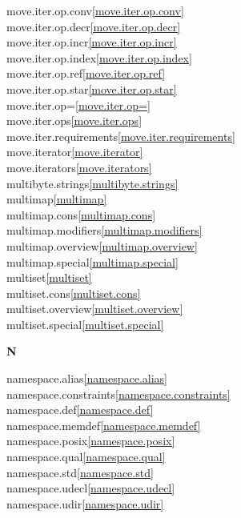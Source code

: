 \begin{multicols}{2}
move.iter.op.conv\quad\ref{move.iter.op.conv}\\
move.iter.op.decr\quad\ref{move.iter.op.decr}\\
move.iter.op.incr\quad\ref{move.iter.op.incr}\\
move.iter.op.index\quad\ref{move.iter.op.index}\\
move.iter.op.ref\quad\ref{move.iter.op.ref}\\
move.iter.op.star\quad\ref{move.iter.op.star}\\
move.iter.op=\quad\ref{move.iter.op=}\\
move.iter.ops\quad\ref{move.iter.ops}\\
move.iter.requirements\quad\ref{move.iter.requirements}\\
move.iterator\quad\ref{move.iterator}\\
move.iterators\quad\ref{move.iterators}\\
multibyte.strings\quad\ref{multibyte.strings}\\
multimap\quad\ref{multimap}\\
multimap.cons\quad\ref{multimap.cons}\\
multimap.modifiers\quad\ref{multimap.modifiers}\\
multimap.overview\quad\ref{multimap.overview}\\
multimap.special\quad\ref{multimap.special}\\
multiset\quad\ref{multiset}\\
multiset.cons\quad\ref{multiset.cons}\\
multiset.overview\quad\ref{multiset.overview}\\
multiset.special\quad\ref{multiset.special}\\
\par \textbf{N}\par
namespace.alias\quad\ref{namespace.alias}\\
namespace.constraints\quad\ref{namespace.constraints}\\
namespace.def\quad\ref{namespace.def}\\
namespace.memdef\quad\ref{namespace.memdef}\\
namespace.posix\quad\ref{namespace.posix}\\
namespace.qual\quad\ref{namespace.qual}\\
namespace.std\quad\ref{namespace.std}\\
namespace.udecl\quad\ref{namespace.udecl}\\
namespace.udir\quad\ref{namespace.udir}\\

\end{multicols}
